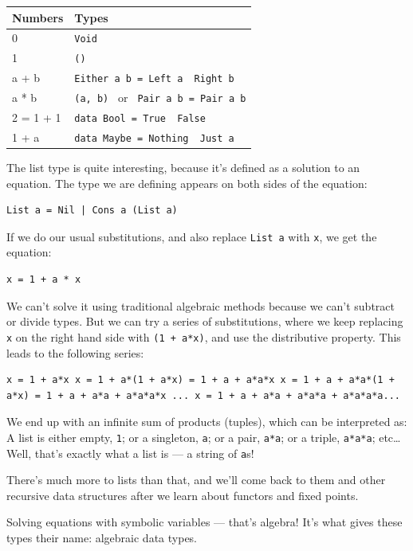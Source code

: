 \begin{longtable}[]{@{}ll@{}}
\toprule
Numbers & Types\tabularnewline
\midrule
\endhead
0 & \texttt{Void}\tabularnewline
1 & \texttt{()}\tabularnewline
a + b &
\texttt{Either\ a\ b\ =\ Left\ a\ \textbar{}\ Right\ b}\tabularnewline
a * b & \texttt{(a,\ b)\ } or
\texttt{\ Pair\ a\ b\ =\ Pair\ a\ b}\tabularnewline
2 = 1 + 1 &
\texttt{data\ Bool\ =\ True\ \textbar{}\ False}\tabularnewline
1 + a &
\texttt{data\ Maybe\ =\ Nothing\ \textbar{}\ Just\ a}\tabularnewline
\bottomrule
\end{longtable}

The list type is quite interesting, because it's defined as a solution
to an equation. The type we are defining appears on both sides of the
equation:

\begin{verbatim}
List a = Nil | Cons a (List a)
\end{verbatim}

If we do our usual substitutions, and also replace \texttt{List\ a} with
\texttt{x}, we get the equation:

\begin{verbatim}
x = 1 + a * x
\end{verbatim}

We can't solve it using traditional algebraic methods because we can't
subtract or divide types. But we can try a series of substitutions,
where we keep replacing \texttt{x} on the right hand side with
\texttt{(1\ +\ a*x)}, and use the distributive property. This leads to
the following series:

\begin{verbatim}
x = 1 + a*x x = 1 + a*(1 + a*x) = 1 + a + a*a*x x = 1 + a + a*a*(1 + a*x) = 1 + a + a*a + a*a*a*x ... x = 1 + a + a*a + a*a*a + a*a*a*a...
\end{verbatim}

We end up with an infinite sum of products (tuples), which can be
interpreted as: A list is either empty, \texttt{1}; or a singleton,
\texttt{a}; or a pair, \texttt{a*a}; or a triple, \texttt{a*a*a};
etc\ldots{} Well, that's exactly what a list is --- a string of
\texttt{a}s!

There's much more to lists than that, and we'll come back to them and
other recursive data structures after we learn about functors and fixed
points.

Solving equations with symbolic variables --- that's algebra! It's what
gives these types their name: algebraic data types.

